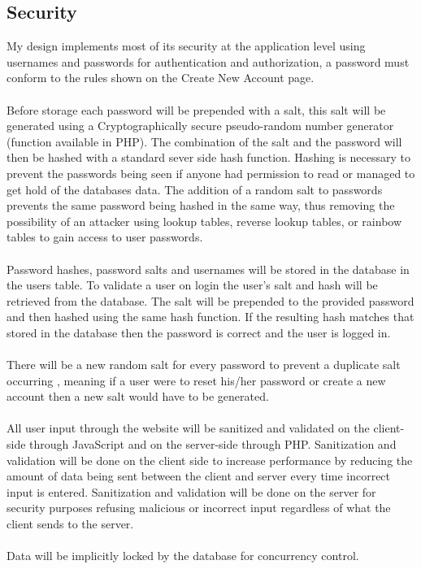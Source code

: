 \documentclass{project}
\begin{document}
\subsection{Security} 
My design implements most of its security at the application level using usernames and passwords for authentication and authorization, a password must conform to the rules shown on the Create New Account page.
\\\\
Before storage each password will be prepended with a salt, this salt will be generated using a Cryptographically secure pseudo-random number generator (function available in PHP). The combination of the salt and the password will then be hashed with a standard sever side hash function. Hashing is necessary to prevent the passwords being seen if anyone had permission to read or managed to get hold of the databases data. The addition of a random salt to passwords prevents the same password being hashed in the same way, thus removing the possibility of an attacker using lookup tables, reverse lookup tables, or rainbow tables to gain access to user passwords.
\\\\
Password hashes, password salts and usernames will be stored in the database in the users table. To validate a user on login the user's salt and hash will be retrieved from the database. The salt will be prepended to the provided password and then hashed using the same hash function. If the resulting hash matches that stored in the database then the password is correct and the user is logged in.
\\\\
There will be a new random salt for every password to prevent a duplicate salt occurring , meaning if a user were to reset his/her password or create a new account then a new salt would have to be generated.
\\\\
All user input through the website will be sanitized and validated on the client-side through JavaScript and on the server-side through PHP. Sanitization and validation will be done on the client side to increase performance by reducing the amount of data being sent between the client and server every time incorrect input is entered. Sanitization and validation will be done on the server for security purposes refusing malicious or incorrect input regardless of what the client sends to the server.
\\\\
Data will be implicitly locked by the database for concurrency control.
\newpage
\end{document}
